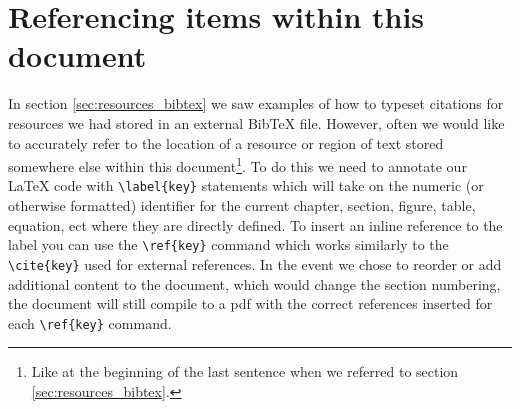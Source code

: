	\section{Referencing items within this document}
		In section \ref{sec:resources_bibtex} we saw examples of how to typeset citations for resources we had stored in an external BibTeX file. However, often we would like to accurately refer to the location of a resource or region of text stored somewhere else within this document\footnote{Like at the beginning of the last sentence when we referred to section \ref{sec:resources_bibtex}.}. To do this we need to annotate our LaTeX code with \lstinline|\label{key}| statements which will take on the numeric (or otherwise formatted) identifier for the current chapter, section, figure, table, equation, ect where they are directly defined. To insert an inline reference to the label you can use the \lstinline|\ref{key}| command which works similarly to the \lstinline|\cite{key}| used for external references. In the event we chose to reorder or add additional content to the document, which would change the section numbering, the document will still compile to a pdf with the correct references inserted for each \lstinline|\ref{key}| command.
		
	
		
	
	
	
	
	
	
